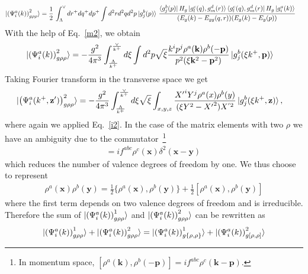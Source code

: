 \documentclass[aps,prd,amsmath,amssymb,nofootinbib]{revtex4-2}
\def\v#1{\mathbf{#1}}
\numberwithin{equation}{section}
\begin{document}
\begin{align}%
  \notag
\ket{  \left(\Psi^{a}_{i}(k) \right)^{2}_{g \rho \rho}} 
   & =  \frac{1}{2}\,\int_{\Lambda}^{\vee} d r^+ dq^+ dp^+ %
   \int d^2 r d^2q d^2p%
   \ket{g_{j}^{b}(p)}\,
   \frac{\bra{g_{j}^{b}(p)}H_{g}\ket{g_{l}^{c}(q),g_{m}^{d}(r)}\bra{g_{l}^{c}(q),g_{m}^{d}(r)}H_{g}\ket{g_{i}^{a}(k)}}{(E_{g}(k)-E_{gg}(q,r))(E_{g}(k)-E_{g}(p))}%
\end{align}
With the help of Eq.~\eqref{m2}, we obtain  
\begin{align}
 \ket{  \left(\Psi^{a}_{i}(k) \right)^{2}_{g \rho \rho}}  & = - \frac{g^2}{4\pi^3}%
   \int_{\frac{\Lambda}{k^{+}}}^{\frac{\vee}{k^{+}}} d \xi %
   \int d^{2}p 
   \sqrt{\xi} \frac{ k^{i}p^{j}\rho^{a}(\v{k})\rho^{b}(-\v{p}) }{ p^{2}(\xi \v{k}^{2}-\v{p}^{2}) }%
   \ket{g_{j}^{b}(\xi k^+,\v{p})}%
   \label{m2grr}
\end{align}
Taking Fourier transform in the transverse space we get 
\begin{align}%
  \ket{  \left(\Psi^{a}_{i}(k^+, \v{z'}) \right)^{2}_{g \rho \rho}}  %
   & = %
   -\frac{g^2}{4 \pi^3}%
   \int_{\frac{\Lambda}{k^{+}}}^{\frac{\vee}{k^{+}}} d \xi \sqrt{\xi}%
   \int_{x,y,z} \frac{{X'}^{i}Y^{j}\rho^{a}(x)\rho^{b}(y)}{(\xi Y^{2}-{X'}^{2}) {X}^{'2}}\ket{g_{j}^{b}(\xi k^+,\v{z})}, 
   \label{m2grrX}
\end{align}
where again we applied Eq.~\eqref{i2}. In the case of the matrix elements with two $\rho$ we have an ambiguity due to the commutator~\footnote{In momentum space,
$   [\rho^{a}(\v{k}), \rho^b(-\v{p})] = i f^{abc} \rho^c(\v{k}-\v{p}) $. 
} 
\begin{align}
  [\rho^{a}(\v{x}), \rho^b(\v{y})] = i f^{abc} \rho^c(\v{x}) \delta^2(\v{x}-\v{y})\,
\end{align}
which reduces the number of valence degrees of freedom by one. We thus choose to represent 
\begin{align}
  \rho^{a}(\v{x}) \rho^b(\v{y}) =   \frac12 \{\rho^{a}(\v{x}), \rho^b(\v{y})\} + \frac12  [\rho^{a}(\v{x}), \rho^b(\v{y})]  
\end{align}
where the first term depends on two valence degrees of freedom and is irreducible. Therefore the sum of   $\ket{ \left(\Psi^{a}_{i}(k) \right)^{1}_{g \rho \rho} }$ and  $\ket{ \left(\Psi^{a}_{i}(k) \right)^{2}_{g \rho \rho} }$ can be rewritten as 
\begin{align}
\ket{ \left(\Psi^{a}_{i}(k) \right)^{1}_{g \rho \rho} }
+\ket{ \left(\Psi^{a}_{i}(k) \right)^{2}_{g \rho \rho} }  = 
\ket{ \left(\Psi^{a}_{i}(k) \right)^{1}_{g \{\rho, \rho\} } }
+\ket{ \left(\Psi^{a}_{i}(k) \right)^{2}_{g [\rho, \rho] } }  
\end{align}
\end{document}
